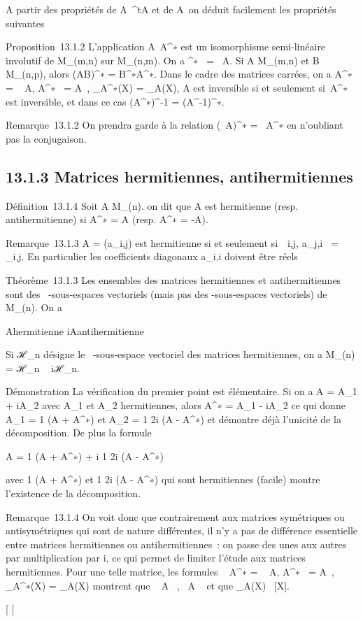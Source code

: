 \documentclass[]{article}
\begin{document}
A partir des propriétés de A\mapsto~^tA
et de A\mapsto~\overlineA on
déduit facilement les propriétés suivantes

Proposition~13.1.2 L'application
A\mapsto~A^∗ est un isomorphisme
semi-linéaire involutif de M_(m,n) sur M_(n,m). On a
\mathrmrgA^∗~
= \mathrmrg~A. Si A \in
M_(m,n) et B \in M_(n,p), alors (AB)^∗ =
B^∗A^∗. Dans le cadre des matrices carrées, on a
 A^∗~ =
\overline{}~
A,
A^∗~ =
\overline{}A~,
\chi_A^∗(X) =
\overline\chi_A(X), A est inversible si et
seulement si~A^∗ est inversible, et dans ce cas
(A^∗)^-1 = (A^-1)^∗.

Remarque~13.1.2 On prendra garde à la relation (\lambda~A)^∗ =
\overline\lambda~A^∗ en n'oubliant pas la
conjugaison.

\subsection{13.1.3 Matrices hermitiennes, antihermitiennes}

Définition~13.1.4 Soit A \in M_(n). on dit que A est hermitienne
(resp. antihermitienne) si A^∗ = A (resp. A^∗ =
-A).

Remarque~13.1.3 A = (a_i,j) est hermitienne si et seulement
si~\forall~i,j, a_j,i~ =
\overlinea_i,j. En particulier les
coefficients diagonaux a_i,i doivent être réels

Théorème~13.1.3 Les ensembles des matrices hermitiennes et
antihermitiennes sont des ~-sous-espaces vectoriels (mais pas des
-sous-espaces vectoriels) de M_(n). On a

A\text hermitienne  \Leftrightarrow
iA\text antihermitienne

Si ℋ_n désigne le ~-sous-espace vectoriel des matrices
hermitiennes, on a M_(n) = ℋ_n \oplus~ iℋ_n.

Démonstration La vérification du premier point est élémentaire. Si on a
A = A_1 + iA_2 avec A_1 et A_2
hermitiennes, alors A^∗ = A_1 - iA_2 ce qui
donne A_1 = 1  (A + A^∗)
et A_2 = 1 \over 2i (A - A^∗) et
démontre déjà l'unicité de la décomposition. De plus la formule

A = 1  (A + A^∗) + i 1
\over 2i (A - A^∗)

avec  1  (A + A^∗) et  1
\over 2i (A - A^∗) qui sont hermitiennes
(facile) montre l'existence de la décomposition.

Remarque~13.1.4 On voit donc que contrairement aux matrices symétriques
ou antisymétriques qui sont de nature différentes, il n'y a pas de
différence essentielle entre matrices hermitiennes ou antihermitiennes~:
on passe des unes aux autres par multiplication par i, ce qui permet de
limiter l'étude aux matrices hermitiennes. Pour une telle matrice, les
formules ~
A^∗ =
\overline{}~
A,
A^∗~ =
\overline{}A~,
\chi_A^∗(X) =
\overline\chi_A(X) montrent que
~ A \in {}~,
~A \in {}~ et que
\chi_A(X) \in {}~[X].

[
[
\end{document}
